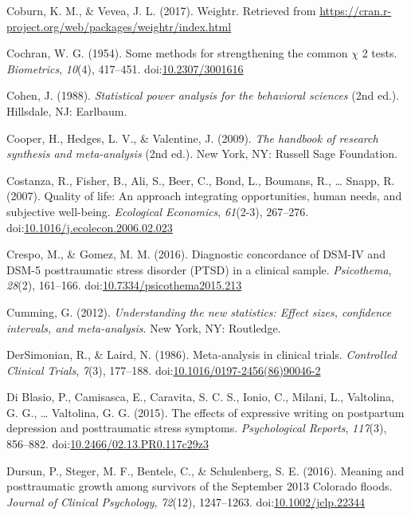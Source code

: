 \documentclass[english,man]{apa6}
\theoremstyle{definition}
\theoremstyle{definition}
\theoremstyle{definition}
\theoremstyle{remark}
\begin{document}
\hypertarget{ref-Coburn2017}{}
Coburn, K. M., \& Vevea, J. L. (2017). Weightr. Retrieved from
\url{https://cran.r-project.org/web/packages/weightr/index.html}

\hypertarget{ref-Cochran1954}{}
Cochran, W. G. (1954). Some methods for strengthening the common
\(\chi\) 2 tests. \emph{Biometrics}, \emph{10}(4), 417--451.
doi:\href{https://doi.org/10.2307/3001616}{10.2307/3001616}

\hypertarget{ref-Cohen1988}{}
Cohen, J. (1988). \emph{Statistical power analysis for the behavioral
sciences} (2nd ed.). Hillsdale, NJ: Earlbaum.

\hypertarget{ref-Cooper2009}{}
Cooper, H., Hedges, L. V., \& Valentine, J. (2009). \emph{The handbook
of research synthesis and meta-analysis} (2nd ed.). New York, NY:
Russell Sage Foundation.

\hypertarget{ref-Costanza2007}{}
Costanza, R., Fisher, B., Ali, S., Beer, C., Bond, L., Boumans, R.,
\ldots{} Snapp, R. (2007). Quality of life: An approach integrating
opportunities, human needs, and subjective well-being. \emph{Ecological
Economics}, \emph{61}(2-3), 267--276.
doi:\href{https://doi.org/10.1016/j.ecolecon.2006.02.023}{10.1016/j.ecolecon.2006.02.023}

\hypertarget{ref-Crespo2016}{}
Crespo, M., \& Gomez, M. M. (2016). Diagnostic concordance of DSM-IV and
DSM-5 posttraumatic stress disorder (PTSD) in a clinical sample.
\emph{Psicothema}, \emph{28}(2), 161--166.
doi:\href{https://doi.org/10.7334/psicothema2015.213}{10.7334/psicothema2015.213}

\hypertarget{ref-Cumming2012}{}
Cumming, G. (2012). \emph{Understanding the new statistics: Effect
sizes, confidence intervals, and meta-analysis}. New York, NY:
Routledge.

\hypertarget{ref-DerSimonian1986}{}
DerSimonian, R., \& Laird, N. (1986). Meta-analysis in clinical trials.
\emph{Controlled Clinical Trials}, \emph{7}(3), 177--188.
doi:\href{https://doi.org/10.1016/0197-2456(86)90046-2}{10.1016/0197-2456(86)90046-2}

\hypertarget{ref-Blasio2015a}{}
Di Blasio, P., Camisasca, E., Caravita, S. C. S., Ionio, C., Milani, L.,
Valtolina, G. G., \ldots{} Valtolina, G. G. (2015). The effects of
expressive writing on postpartum depression and posttraumatic stress
symptoms. \emph{Psychological Reports}, \emph{117}(3), 856--882.
doi:\href{https://doi.org/10.2466/02.13.PR0.117c29z3}{10.2466/02.13.PR0.117c29z3}

\hypertarget{ref-Dursun2016}{}
Dursun, P., Steger, M. F., Bentele, C., \& Schulenberg, S. E. (2016).
Meaning and posttraumatic growth among survivors of the September 2013
Colorado floods. \emph{Journal of Clinical Psychology}, \emph{72}(12),
1247--1263.
doi:\href{https://doi.org/10.1002/jclp.22344}{10.1002/jclp.22344}
\end{document}
